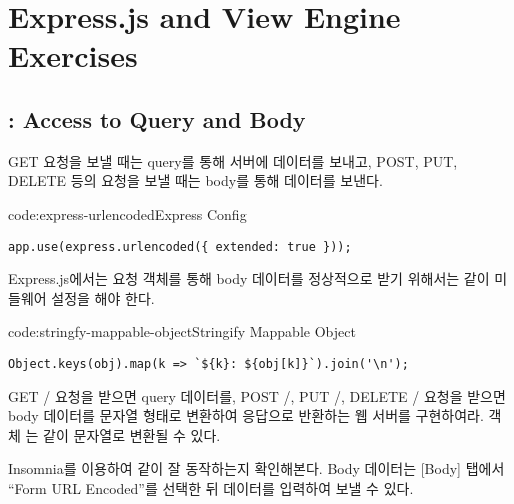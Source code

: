 \section{Express.js and View Engine Exercises}\label{sect:express-js-and-view-engine-exercises}

\subsection*{: Access to Query and Body}

GET 요청을 보낼 때는 query를 통해 서버에 데이터를 보내고, POST, PUT, DELETE 등의 요청을 보낼 때는 body를 통해 데이터를 보낸다.

\begin{codeenv}{code:express-urlencoded}{Express  Config}\begin{verbatim}
app.use(express.urlencoded({ extended: true }));
\end{verbatim}
\end{codeenv}

Express.js에서는 요청 객체를 통해 body 데이터를 정상적으로 받기 위해서는 \와 같이 미들웨어 설정을 해야 한다.

\begin{codeenv}{code:stringfy-mappable-object}{Stringify Mappable Object}\begin{verbatim}
Object.keys(obj).map(k => `${k}: ${obj[k]}`).join('\n');
\end{verbatim}
\end{codeenv}

GET / 요청을 받으면 query 데이터를, POST /, PUT /, DELETE / 요청을 받으면 body 데이터를 문자열 형태로 변환하여 응답으로 반환하는 웹 서버를 구현하여라. 객체 는 \와 같이 문자열로 변환될 수 있다.


Insomnia를 이용하여 \와 같이 잘 동작하는지 확인해본다. Body 데이터는 [Body] 탭에서 ``Form URL Encoded''를 선택한 뒤 데이터를 입력하여 보낼 수 있다.
\clearpage

